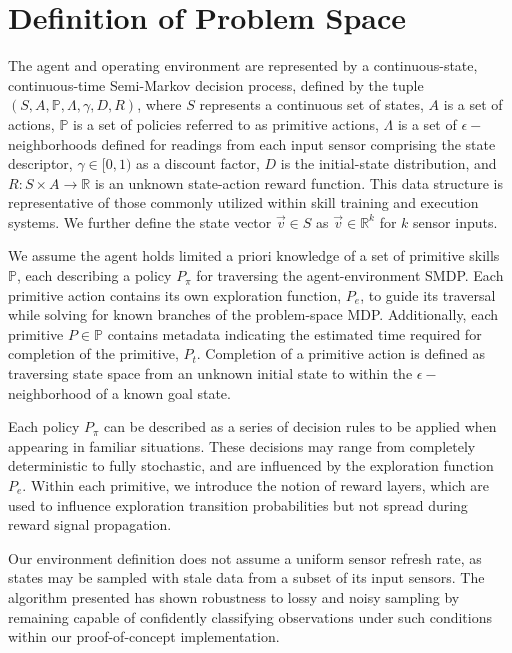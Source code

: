 \documentclass[letterpaper]{article}
\begin{document}
\section{Definition of Problem Space}
\label{sec:pspace}
  The agent and operating environment are represented by a continuous-state, continuous-time Semi-Markov decision process, defined by the tuple $(S,A,\mathbb{P},\Lambda,\gamma,D,R)$, where $S$ represents a continuous set of states, $A$ is a set of actions, $\mathbb{P}$ is a set of policies referred to as primitive actions, $\Lambda$ is a set of $\epsilon-$neighborhoods defined for readings from each input sensor comprising the state descriptor, $\gamma \in [0,1)$ as a discount factor, $D$ is the initial-state distribution, and $R : S \times A \rightarrow \mathbb{R}$ is an unknown state-action reward function. This data structure is representative of those commonly utilized within skill training and execution systems. We further define the state vector $\vec{v} \in S$ as $\vec{v} \in \mathbb{R}^k$ for $k$ sensor inputs.

We assume the agent holds limited a priori knowledge of a set of primitive skills $\mathbb{P}$, each describing a policy $P_\pi$ for traversing the agent-environment SMDP. Each primitive action contains its own exploration function, $P_e$, to guide its traversal while solving for known branches of the problem-space MDP. Additionally, each primitive $P \in \mathbb{P}$ contains metadata indicating the estimated time required for completion of the primitive, $P_t$. Completion of a primitive action is defined as traversing state space from an unknown initial state to within the $\epsilon-$neighborhood of a known goal state.

Each policy $P_\pi$ can be described as a series of decision rules to be applied when appearing in familiar situations. These decisions may range from completely deterministic to fully stochastic, and are influenced by the exploration function $P_e$. Within each primitive, we introduce the notion of reward layers, which are used to influence exploration transition probabilities but not spread during reward signal propagation.

Our environment definition does not assume a uniform sensor refresh rate, as states may be sampled with stale data from a subset of its input sensors. The algorithm presented has shown robustness to lossy and noisy sampling by remaining capable of confidently classifying observations under such conditions within our proof-of-concept implementation.
\end{document}
